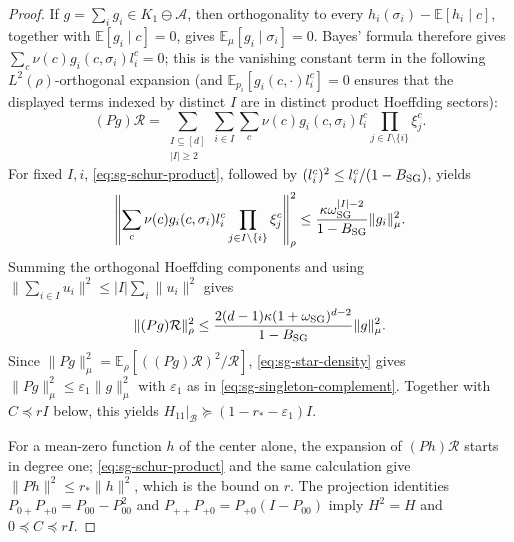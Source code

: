 \begin{proof}
If $g=\sum_i g_i\in K_1\ominus\mathcal A$, then orthogonality to every
$h_i(\sigma_i)-\mathbb E[h_i\mid c]$, together with
$\mathbb E[g_i\mid c]=0$, gives
$\mathbb E_\mu[g_i\mid\sigma_i]=0$.  Bayes' formula therefore gives
$\sum_c\nu(c)g_i(c,\sigma_i)l_i^c=0$; this is the vanishing constant
term in the following $L^2(\rho)$-orthogonal expansion (and
$\mathbb E_{p_i}[g_i(c,\cdot)l_i^c]=0$ ensures that the displayed terms
indexed by distinct $I$ are in distinct product Hoeffding sectors):
\begin{equation}\label{eq:sg-hoeffding-expansion}
 (Pg)\mathcal R=\sum_{\substack{I\subseteq[d]\\|I|\ge2}}
 \sum_{i\in I}\sum_c \nu(c)g_i(c,\sigma_i)l_i^c
 \prod_{j\in I\setminus\{i\}}\xi_j^c .
\end{equation}
For fixed $I,i$, \eqref{eq:sg-schur-product}, followed by $(l_i^c)^2\le l_i^c/(1-B_{\rm SG})$, yields
\begin{equation}\label{eq:sg-component-bound}
 \left\|\sum_c\nu(c)g_i(c,\sigma_i)l_i^c
 \prod_{j\in I\setminus\{i\}}\xi_j^c\right\|_\rho^2
 \le \frac{\kappa \omega_{\rm SG}^{|I|-2}}{1-B_{\rm SG}}\|g_i\|_\mu^2.
\end{equation}
Summing the orthogonal Hoeffding components and using
$\|\sum_{i\in I}u_i\|^2\le |I|\sum_i\|u_i\|^2$ gives
\[
 \|(Pg)\mathcal R\|_\rho^2\le \frac{2(d-1)\kappa(1+\omega_{\rm SG})^{d-2}}{1-B_{\rm SG}}\|g\|_\mu^2.
\]
Since $\|Pg\|_\mu^2=\mathbb E_\rho[((Pg)\mathcal R)^2/\mathcal R]$,
\eqref{eq:sg-star-density} gives $\|Pg\|_\mu^2\le\varepsilon_1\|g\|_\mu^2$
with $\varepsilon_1$ as in \eqref{eq:sg-singleton-complement}.
Together with $C\preceq rI$ below, this yields
$H_{11}|_{\mathcal B}\succeq(1-r_*-\varepsilon_1)I$.

For a mean-zero function $h$ of the center alone, the expansion of
$(Ph)\mathcal R$ starts in degree one;
\eqref{eq:sg-schur-product} and the same calculation give $\|Ph\|^2\le r_*\|h\|^2$,
which is the bound on $r$.  The projection identities
$P_{0+}P_{+0}=P_{00}-P_{00}^2$ and
$P_{++}P_{+0}=P_{+0}(I-P_{00})$ imply $H^2=H$ and
$0\preceq C\preceq rI$.


\end{proof}
